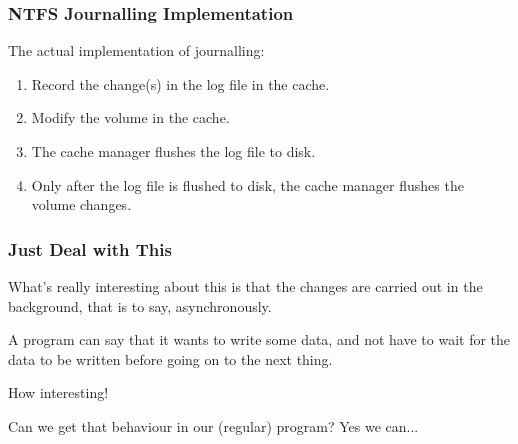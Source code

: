 \begin{frame}
\frametitle{NTFS Journalling Implementation}

The actual implementation of journalling:

\begin{enumerate}
	\item Record the change(s) in the log file in the cache.
	\item Modify the volume in the cache.
	\item The cache manager flushes the log file to disk.
	\item Only after the log file is flushed to disk, the cache manager flushes the volume changes.
\end{enumerate}

\end{frame}


\begin{frame}
\frametitle{Just Deal with This}

What's really interesting about this is that the changes are carried out in the background, that is to say, asynchronously. 

A program can say that it wants to write some data, and not have to wait for the data to be written before going on to the next thing. 

How interesting!

Can we get that behaviour in our (regular) program? Yes we can...


\end{frame}






